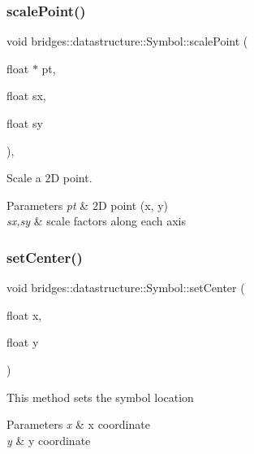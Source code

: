 \subsubsection{\texorpdfstring{scale\+Point()}{scalePoint()}}
{\footnotesize\ttfamily void bridges\+::datastructure\+::\+Symbol\+::scale\+Point (\begin{DoxyParamCaption}\item[{float $\ast$}]{pt,  }\item[{float}]{sx,  }\item[{float}]{sy }\end{DoxyParamCaption})\hspace{0.3cm}{\ttfamily [inline]}, {\ttfamily [protected]}}



Scale a 2D point. 


\begin{DoxyParams}{Parameters}
{\em pt} & 2D point (x, y) \\
\hline
{\em sx,sy} & scale factors along each axis \\
\hline
\end{DoxyParams}
\mbox{\label{classbridges_1_1datastructure_1_1_symbol_a98a1c3d133e7fe2150d933495e421760}} 
\subsubsection{\texorpdfstring{set\+Center()}{setCenter()}}
{\footnotesize\ttfamily void bridges\+::datastructure\+::\+Symbol\+::set\+Center (\begin{DoxyParamCaption}\item[{float}]{x,  }\item[{float}]{y }\end{DoxyParamCaption})\hspace{0.3cm}{\ttfamily [inline]}}

This method sets the symbol location


\begin{DoxyParams}{Parameters}
{\em x} & x coordinate \\
\hline
{\em y} & y coordinate \\
\hline
\end{DoxyParams}
\mbox{\label{classbridges_1_1datastructure_1_1_symbol_a3019a17458fe5f0381cfd611338af6f7}} 

